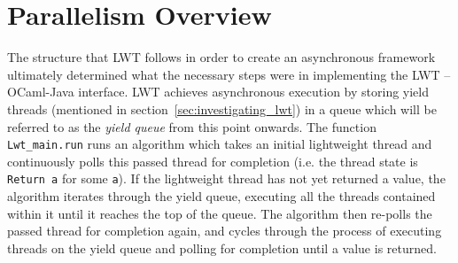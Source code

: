 \documentclass[12pt,twoside,notitlepage]{report}
\begin{document}
\section{Parallelism Overview}
\label{sec:parallelism_overview}
%
%
The structure that LWT follows in order to create an asynchronous framework ultimately determined what the necessary steps were in implementing the LWT -- OCaml-Java interface. LWT achieves asynchronous execution by storing
yield threads (mentioned in section~\ref{sec:investigating_lwt}) in a queue which will be referred to as the {\em yield queue} from this point onwards. The function {\tt Lwt\_main.run} runs an algorithm which takes an initial
lightweight thread and
continuously polls this passed thread for completion (i.e. the thread state is {\tt Return a} for some {\tt a}). If the lightweight thread has not yet returned a value, the algorithm iterates through the yield queue, executing all the threads contained within it
until it reaches the top of the queue. The algorithm then re-polls the passed thread for completion again, and cycles through the process of executing threads on the yield queue and polling for completion until a value is returned. 
\end{document}
